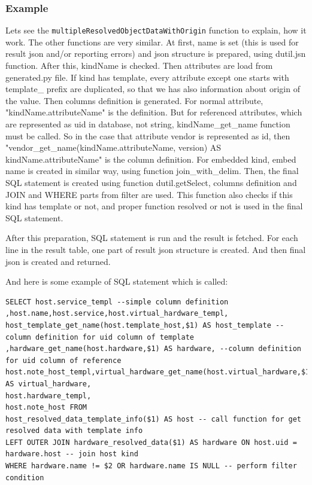 \documentclass[deska]{subfiles}
\begin{document}
\subsubsection{Example}
Lets see the {\tt multipleResolvedObjectDataWithOrigin} function to explain, how it work. The other functions are very similar.
At first, name is set (this is used for result json and/or reporting errors) and json structure is prepared,
using dutil.jsn function. After this, kindName is checked. Then attributes are load from generated.py file.
If kind has template, every attribute except one starts with template\_ prefix are duplicated, so that we has
also information about origin of the value.
Then columns definition is generated. For normal attribute, "kindName.attributeName" is the definition.
But for referenced attributes, which are
represented as uid in database, not string, kindName\_get\_name function must be called. So in the case that attribute vendor is represented as id, then
"vendor\_get\_name(kindName.attributeName, version) AS kindName.attributeName" is the column definition. For embedded kind, embed name is created in similar way,
using function join\_with\_delim.
Then, the final SQL statement is created using function dutil.getSelect, columns definition and JOIN and WHERE parts from filter are used.
This function also checks if this kind has template or not, and proper function resolved or not is used in the final SQL statement.

After this preparation, SQL statement is run and the result is fetched. For each line in the result table, one part of result json structure is
created. And then final json is created and returned.

And here is some example of SQL statement which is called:
\begin{verbatim}
SELECT host.service_templ --simple column definition
,host.name,host.service,host.virtual_hardware_templ,
host_template_get_name(host.template_host,$1) AS host_template --column definition for uid column of template
,hardware_get_name(host.hardware,$1) AS hardware, --column definition for uid column of reference
host.note_host_templ,virtual_hardware_get_name(host.virtual_hardware,$1) AS virtual_hardware,
host.hardware_templ,
host.note_host FROM
host_resolved_data_template_info($1) AS host -- call function for get resolved data with template info
LEFT OUTER JOIN hardware_resolved_data($1) AS hardware ON host.uid = hardware.host -- join host kind
WHERE hardware.name != $2 OR hardware.name IS NULL -- perform filter condition
\end{verbatim}
\end{document}
